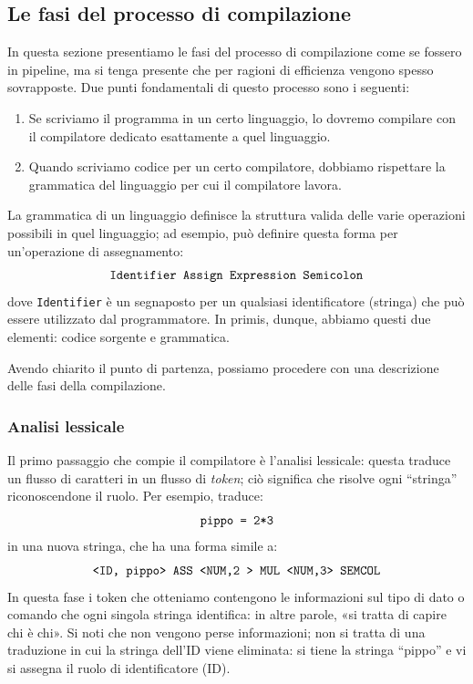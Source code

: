 \documentclass[class=book, crop=false, oneside, 12pt]{standalone}
\begin{document}
\subsection{Le fasi del processo di compilazione}
In questa sezione presentiamo le fasi del processo di compilazione come se fossero in pipeline, ma si tenga presente che per ragioni di efficienza vengono spesso sovrapposte. Due punti fondamentali di questo processo sono i seguenti:
\begin{enumerate}
    \item Se scriviamo il programma in un certo linguaggio, lo dovremo compilare con il compilatore dedicato esattamente a quel linguaggio.
    \item Quando scriviamo codice per un certo compilatore, dobbiamo rispettare la grammatica del linguaggio per cui il compilatore lavora.
\end{enumerate}
La grammatica di un linguaggio definisce la struttura valida delle varie operazioni possibili in quel linguaggio; ad esempio, può definire questa forma per un’operazione di assegnamento:
\begin{equation*}
	\textrm{\texttt{Identifier Assign Expression Semicolon}}
\end{equation*}
dove \texttt{Identifier} è un segnaposto per un qualsiasi identificatore (stringa) che può essere utilizzato dal programmatore.
In primis, dunque, abbiamo questi due elementi: codice sorgente e grammatica.

Avendo chiarito il punto di partenza, possiamo procedere con una descrizione delle fasi della compilazione.

\subsubsection{Analisi lessicale}
Il primo passaggio che compie il compilatore è l’analisi lessicale: questa traduce un flusso di caratteri in un flusso di \emph{token}; ciò significa che risolve ogni “stringa” riconoscendone il ruolo. Per esempio, traduce:
\begin{equation*}
	\textrm{\texttt{pippo = 2*3}}
\end{equation*}
in una nuova stringa, che ha una forma simile a:
\begin{equation*}
	\textrm{\texttt{<ID, pippo> ASS <NUM,2 > MUL <NUM,3> SEMCOL}}
\end{equation*}
In questa fase i token che otteniamo contengono le informazioni sul tipo di dato o comando che ogni singola stringa identifica: in altre parole, «si tratta di capire chi è chi». Si noti che non vengono perse informazioni; non si tratta di una traduzione in cui la stringa dell’ID viene eliminata: si tiene la stringa “pippo” e vi si assegna il ruolo di identificatore (ID).
\end{document}
